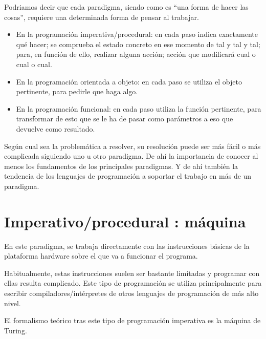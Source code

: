 \documentclass[spanish,12pt,a4paper,final,oneside]{book}
\begin{document}
Podriamos decir que cada paradigma, siendo como es ``una forma de hacer las cosas'', requiere una determinada forma de pensar al trabajar. 
\begin{itemize}

\item En la programación imperativa/procedural: en cada paso indica exactamente qué hacer; se comprueba el estado concreto en ese momento de tal y tal y tal; para, en función de ello, realizar alguna acción; acción que modificará cual o cual o cual.

\item En la programación orientada a objeto: en cada paso se utiliza el objeto pertinente, para pedirle que haga algo.

\item En la programación funcional: en cada paso utiliza la función pertinente, para transformar de esto que se le ha de pasar como parámetros a eso que devuelve como resultado.

\end{itemize}

Según cual sea la problemática a resolver, su resolución puede ser más fácil o más complicada siguiendo uno u otro paradigma. De ahí la importancia de conocer al menos los fundamentos de los principales paradigmas. Y de ahí también la tendencia de los lenguajes de programación a soportar el trabajo en más de un paradigma.

\section{Imperativo/procedural : máquina}
En este paradigma, se trabaja directamente con las instrucciones básicas de la plataforma hardware sobre el que va a funcionar el programa.

Habitualmente, estas instrucciones suelen ser bastante limitadas y programar con ellas resulta complicado. Este tipo de programación se utiliza principalmente para escribir compiladores/intérpretes de otros lenguajes de programación de más alto nivel.

El formalismo teórico tras este tipo de programación imperativa es la máquina de Turing.
\end{document}
